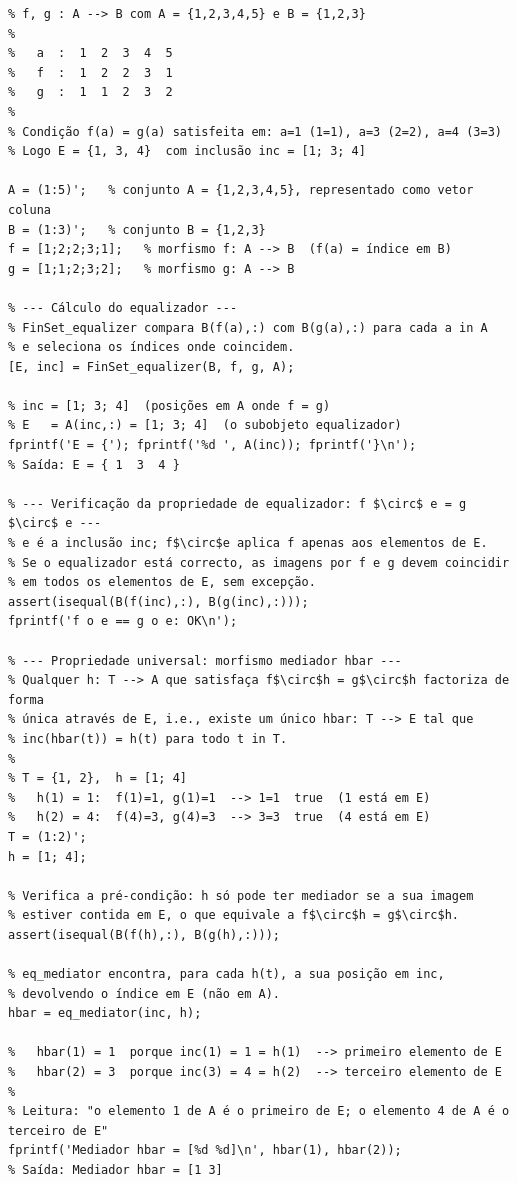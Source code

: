 \begin{lstlisting}[style=matlab, caption={Exemplo numérico do equalizador}]
% EXEMPLO NUMÉRICO DO EQUALIZADOR
% f, g : A --> B com A = {1,2,3,4,5} e B = {1,2,3}
%
%   a  :  1  2  3  4  5
%   f  :  1  2  2  3  1
%   g  :  1  1  2  3  2
%
% Condição f(a) = g(a) satisfeita em: a=1 (1=1), a=3 (2=2), a=4 (3=3)
% Logo E = {1, 3, 4}  com inclusão inc = [1; 3; 4]

A = (1:5)';   % conjunto A = {1,2,3,4,5}, representado como vetor coluna
B = (1:3)';   % conjunto B = {1,2,3}
f = [1;2;2;3;1];   % morfismo f: A --> B  (f(a) = índice em B)
g = [1;1;2;3;2];   % morfismo g: A --> B

% --- Cálculo do equalizador ---
% FinSet_equalizer compara B(f(a),:) com B(g(a),:) para cada a in A
% e seleciona os índices onde coincidem.
[E, inc] = FinSet_equalizer(B, f, g, A);

% inc = [1; 3; 4]  (posições em A onde f = g)
% E   = A(inc,:) = [1; 3; 4]  (o subobjeto equalizador)
fprintf('E = {'); fprintf('%d ', A(inc)); fprintf('}\n');
% Saída: E = { 1  3  4 }

% --- Verificação da propriedade de equalizador: f $\circ$ e = g $\circ$ e ---
% e é a inclusão inc; f$\circ$e aplica f apenas aos elementos de E.
% Se o equalizador está correcto, as imagens por f e g devem coincidir
% em todos os elementos de E, sem excepção.
assert(isequal(B(f(inc),:), B(g(inc),:)));
fprintf('f o e == g o e: OK\n');

% --- Propriedade universal: morfismo mediador hbar ---
% Qualquer h: T --> A que satisfaça f$\circ$h = g$\circ$h factoriza de forma
% única através de E, i.e., existe um único hbar: T --> E tal que
% inc(hbar(t)) = h(t) para todo t in T.
%
% T = {1, 2},  h = [1; 4]
%   h(1) = 1:  f(1)=1, g(1)=1  --> 1=1  true  (1 está em E)
%   h(2) = 4:  f(4)=3, g(4)=3  --> 3=3  true  (4 está em E)
T = (1:2)';
h = [1; 4];

% Verifica a pré-condição: h só pode ter mediador se a sua imagem
% estiver contida em E, o que equivale a f$\circ$h = g$\circ$h.
assert(isequal(B(f(h),:), B(g(h),:)));

% eq_mediator encontra, para cada h(t), a sua posição em inc,
% devolvendo o índice em E (não em A).
hbar = eq_mediator(inc, h);

%   hbar(1) = 1  porque inc(1) = 1 = h(1)  --> primeiro elemento de E
%   hbar(2) = 3  porque inc(3) = 4 = h(2)  --> terceiro elemento de E
%
% Leitura: "o elemento 1 de A é o primeiro de E; o elemento 4 de A é o terceiro de E"
fprintf('Mediador hbar = [%d %d]\n', hbar(1), hbar(2));
% Saída: Mediador hbar = [1 3]
\end{lstlisting}

